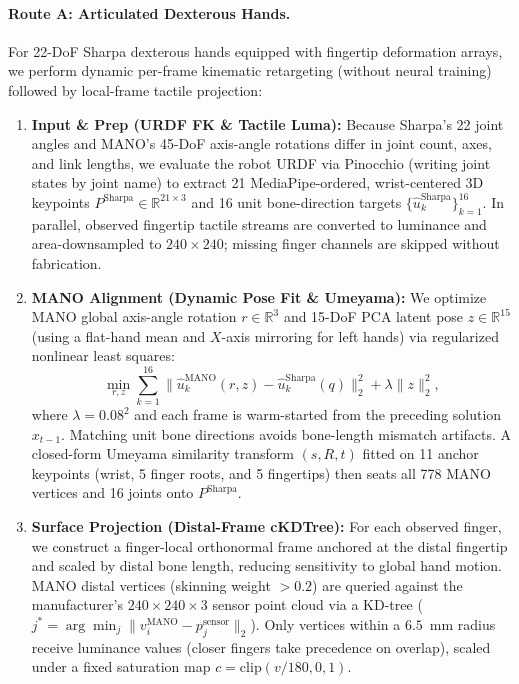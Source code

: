 \paragraph{Route A: Articulated Dexterous Hands.}
For 22-DoF Sharpa dexterous hands equipped with fingertip deformation arrays, we perform dynamic per-frame kinematic retargeting (without neural training) followed by local-frame tactile projection:
\begin{enumerate}[leftmargin=*,nosep]
    \item \textbf{Input \& Prep (URDF FK \& Tactile Luma):} Because Sharpa's 22 joint angles and MANO's 45-DoF axis-angle rotations differ in joint count, axes, and link lengths, we evaluate the robot URDF via Pinocchio (writing joint states by joint name) to extract 21 MediaPipe-ordered, wrist-centered 3D keypoints $P^{\text{Sharpa}} \in \mathbb{R}^{21 \times 3}$ and 16 unit bone-direction targets $\{\hat{u}^{\text{Sharpa}}_k\}_{k=1}^{16}$. In parallel, observed fingertip tactile streams are converted to luminance and area-downsampled to $240\times 240$; missing finger channels are skipped without fabrication.
    \item \textbf{MANO Alignment (Dynamic Pose Fit \& Umeyama):} We optimize MANO global axis-angle rotation $r \in \mathbb{R}^3$ and 15-DoF PCA latent pose $z \in \mathbb{R}^{15}$ (using a flat-hand mean and $X$-axis mirroring for left hands) via regularized nonlinear least squares:
    \begin{equation}
        \min_{r, z} \sum_{k=1}^{16} \| \hat{u}^{\text{MANO}}_k(r, z) - \hat{u}^{\text{Sharpa}}_k(q) \|_2^2 + \lambda \|z\|_2^2,
    \end{equation}
    where $\lambda = 0.08^2$ and each frame is warm-started from the preceding solution $x_{t-1}$. Matching unit bone directions avoids bone-length mismatch artifacts. A closed-form Umeyama similarity transform $(s, R, t)$ \citep{umeyama1991least} fitted on 11 anchor keypoints (wrist, 5 finger roots, and 5 fingertips) then seats all 778 MANO vertices and 16 joints onto $P^{\text{Sharpa}}$.
    \item \textbf{Surface Projection (Distal-Frame cKDTree):} For each observed finger, we construct a finger-local orthonormal frame anchored at the distal fingertip and scaled by distal bone length, reducing sensitivity to global hand motion. MANO distal vertices (skinning weight $>0.2$) are queried against the manufacturer's $240\times 240\times 3$ sensor point cloud via a KD-tree ($j^* = \arg\min_j \|v^{\text{MANO}}_i - p^{\text{sensor}}_j\|_2$). Only vertices within a $6.5$~mm radius receive luminance values (closer fingers take precedence on overlap), scaled under a fixed saturation map $c = \mathrm{clip}(v/180, 0, 1)$.

\end{enumerate}
